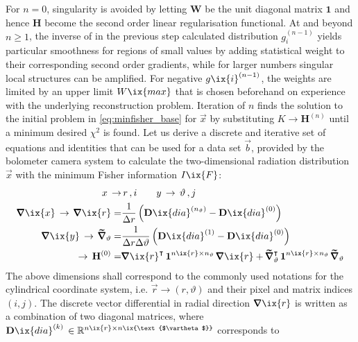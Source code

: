 %
        For $n=0$, singularity is avoided by letting $\mathbf{W}$ be the unit diagonal matrix $\mathbf{1}$ and hence $\mathbf{H}$ become the second order linear regularisation functional. At and beyond $n\ge1$, the inverse of in the previous step calculated distribution $g_{i}^{\left(n-1\right)}$ yields particular smoothness for regions of small values by adding statistical weight to their corresponding second order gradients, while for larger numbers singular local structures can be amplified. For negative $g\ix{i}^{\left(n-1\right)}$, the weights are limited by an upper limit $W\ix{max}$ that is chosen beforehand on experience with the underlying reconstruction problem. Iteration of $n$ finds the solution to the initial problem in \cref{eq:minfisher_base} for $\vec{x}$ by substituting $K\rightarrow\mathbf{H}^{\left(n\right)}$ until a minimum desired $\chi^{2}$ is found. Let us derive a discrete and iterative set of equations and identities that can be used for a data set $\vec{b}$, provided by the bolometer camera system to calculate the two-dimensional radiation distribution $\vec{x}$ with the minimum Fisher information $I\ix{F}$:%
%
        \begin{align}%
            \begin{split}%
                x\,\to&\, r\,,i\qquad y\,\to\,\vartheta\,,j\\%
                \pmb{\nabla}\ix{x}\,\to\,\pmb{\nabla}\ix{r}=&\frac{1}{\Delta r}\left(\mathbf{D}\ix{dia}^{\left(n_{\vartheta}\right)}-\mathbf{D}\ix{dia}^{\left(0\right)}\right)\\%
                \pmb{\nabla}\ix{y}\,\to\,\pmb{\widetilde{\nabla}}_{\vartheta}= &\frac{1}{\Delta r\Delta\vartheta}\left(\mathbf{D}\ix{dia}^{\left(1\right)}-\mathbf{D}\ix{dia}^{\left(0\right)}\right)\\%
                \to\,\mathbf{H}^{\left(0\right)}=&\pmb{\nabla}\ix{r}^{\intercal}\,\mathbf{1}^{n\ix{r}\times n_{\vartheta}}\,\pmb{\nabla}\ix{r}+\pmb{\widetilde{\nabla}}_{\vartheta}^{\intercal}\,\mathbf{1}^{n\ix{r}\times n_{\vartheta}}\,\pmb{\widetilde{\nabla}}_{\vartheta}%
            \end{split}\label{eq:fisher_algo}%
        \end{align}%
%
        The above dimensions shall correspond to the commonly used notations for the cylindrical coordinate system, i.e. $\vec{r}\rightarrow\left(r,\vartheta\right)$ and their pixel and matrix indices $\left(i,j\right)$. The discrete vector differential in radial direction $\pmb{\nabla}\ix{r}$ is written as a combination of two diagonal matrices, where $\mathbf{D}\ix{dia}^{\left(k\right)}\,\in\mathbb{R}^{n\ix{r}\times n\ix{\text{$\vartheta$}}}$ corresponds to%
